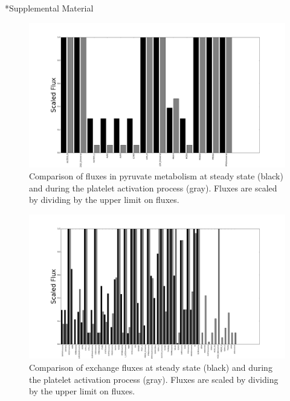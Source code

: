 \documentclass[11pt]{article}
\makeatletter
\renewcommand\section{\@startsection
	{subsection}{2}{0mm}
	{-0.2in}
	{0.05\baselineskip}
	{\normalfont\large\bfseries}}
\renewcommand{\figurename}{Fig.}
\makeatother
\begin{document}
\section*{Supplemental Material}
\setcounter{figure}{0}    %
\renewcommand{\figurename}{S}
\begin{landscape}
\begin{figure}
\hspace{-2cm}
\includegraphics[scale=.55]{../figures/Ca_barPyruvateMetabolism}
\caption{Comparison of fluxes in pyruvate metabolism at steady state (black) and during the platelet activation process (gray). Fluxes are scaled by dividing by the upper limit on fluxes.}
\label{fig:pyruvate}
\end{figure}


\begin{figure}
\hspace{-2cm}
\includegraphics[scale=.55]{../figures/Ca_barTransport_Extracellular}
\caption{Comparison of exchange fluxes at steady state (black) and during the platelet activation process (gray). Fluxes are scaled by dividing by the upper limit on fluxes.}
\label{fig:Ca_Exchange}
\end{figure}


\end{landscape}
\end{document}

